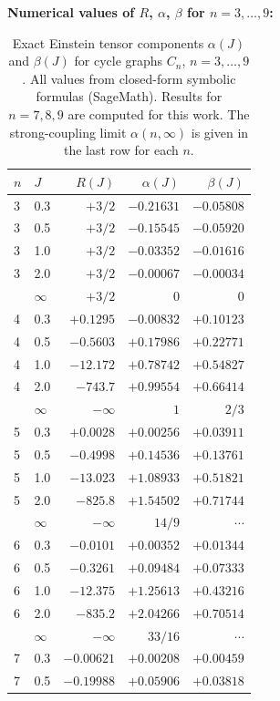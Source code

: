 \documentclass[11pt]{article}
\theoremstyle{definition}
\theoremstyle{remark}
\begin{document}
\textbf{Numerical values of $R$, $\alpha$, $\beta$ for $n = 3, \ldots, 9$:}

\begin{table}[ht]
\centering
\caption{Exact Einstein tensor components $\alpha(J)$ and $\beta(J)$ for
cycle graphs $C_n$, $n=3,\ldots,9$. All values from closed-form symbolic
formulas (SageMath). Results for $n=7,8,9$ are computed for this work.
The strong-coupling limit $\alpha(n,\infty)$ is given in the last row for each $n$.}
\label{tab:cn-exact-alpha-beta}
\renewcommand{\arraystretch}{1.2}
\begin{tabular}{llrrr}
\toprule
$n$ & $J$ & $R(J)$ & $\alpha(J)$ & $\beta(J)$ \\
\midrule
3 & 0.3 & $+3/2$ & $-0.21631$ & $-0.05808$ \\
3 & 0.5 & $+3/2$ & $-0.15545$ & $-0.05920$ \\
3 & 1.0 & $+3/2$ & $-0.03352$ & $-0.01616$ \\
3 & 2.0 & $+3/2$ & $-0.00067$ & $-0.00034$ \\
& $\infty$ & $+3/2$ & $0$ & $0$ \\
\midrule
4 & 0.3 & $+0.1295$ & $-0.00832$ & $+0.10123$ \\
4 & 0.5 & $-0.5603$ & $+0.17986$ & $+0.22771$ \\
4 & 1.0 & $-12.172$ & $+0.78742$ & $+0.54827$ \\
4 & 2.0 & $-743.7$ & $+0.99554$ & $+0.66414$ \\
& $\infty$ & $-\infty$ & $1$ & $2/3$ \\
\midrule
5 & 0.3 & $+0.0028$ & $+0.00256$ & $+0.03911$ \\
5 & 0.5 & $-0.4998$ & $+0.14536$ & $+0.13761$ \\
5 & 1.0 & $-13.023$ & $+1.08933$ & $+0.51821$ \\
5 & 2.0 & $-825.8$ & $+1.54502$ & $+0.71744$ \\
& $\infty$ & $-\infty$ & $14/9$ & $\cdots$ \\
\midrule
6 & 0.3 & $-0.0101$ & $+0.00352$ & $+0.01344$ \\
6 & 0.5 & $-0.3261$ & $+0.09484$ & $+0.07333$ \\
6 & 1.0 & $-12.375$ & $+1.25613$ & $+0.43216$ \\
6 & 2.0 & $-835.2$ & $+2.04266$ & $+0.70514$ \\
& $\infty$ & $-\infty$ & $33/16$ & $\cdots$ \\
\midrule
7 & 0.3 & $-0.00621$ & $+0.00208$ & $+0.00459$ \\
7 & 0.5 & $-0.19988$ & $+0.05906$ & $+0.03818$ \\

\end{tabular}
\end{table}
\end{document}
